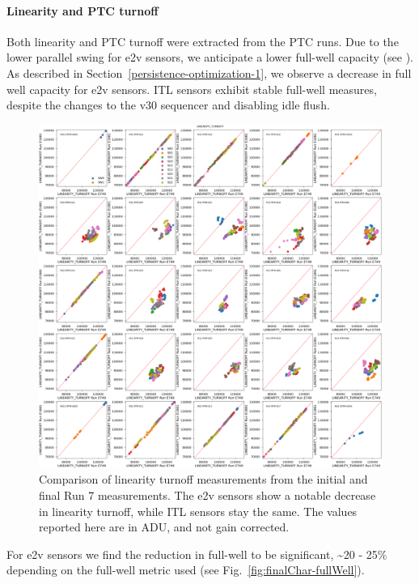 \paragraph{Linearity and PTC turnoff}\label{final-linearity-and-ptc-turnoff}

Both linearity and PTC turnoff were extracted from the PTC runs. Due to the lower parallel swing for e2v sensors, we anticipate a lower full-well capacity (see \cite{2001sccd.book.....J}). As described in Section~\ref{persistence-optimization-1}, we observe a decrease in full well capacity for e2v sensors. ITL sensors exhibit stable full-well measures, despite the changes to the v30 sequencer and disabling idle flush.

\begin{figure}
    \centering
    \includegraphics[width=0.7\linewidth]{figures/finalCharacterization/E749_E1881_LINEARITY_TURNOFF.png}
    \caption{Comparison of linearity turnoff measurements from the initial and final Run 7 measurements. The e2v sensors show a notable decrease in linearity turnoff, while ITL sensors stay the same. The values reported here are in ADU, and not gain corrected.}
    \label{fig:finalChar-Linearity-5x5}
\end{figure}

For e2v sensors we find the reduction in full-well to be significant, \textasciitilde20 - 25\% depending on the full-well metric used (see Fig.~\ref{fig:finalChar-fullWell}).

